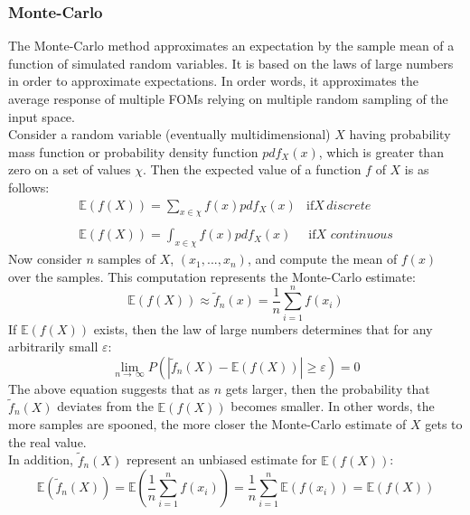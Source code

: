 \subsubsection{Monte-Carlo}
\label{subsub:MCtheory}
The Monte-Carlo method approximates an expectation by the sample mean of a function of 
simulated random variables. It is based on the laws of large numbers in order to approximate expectations. 
In order words, it approximates the average response of multiple FOMs 
relying on multiple random sampling of the input space. 
\\Consider a random variable (eventually multidimensional) $X$ having probability mass function or probability density function $pdf_{X}(x)$,
which is greater than zero on a set of values $\chi$. Then the expected value of a function $f$ of $X$ is as follows:
\begin{equation}
\begin{matrix}
\mathbb{E}(f(X)) =\sum_{x \in \chi} f(x)pdf_{X}(x) & \text{if} X \, discrete \\ 
\\ 
\mathbb{E}(f(X)) =\int_{x \in \chi} f(x)pdf_{X}(x) & \, \text{if} X \, \, continuous
\end{matrix}
\end{equation}
Now consider $n$ samples of $X$, $(x_{1},...,x_{n})$, and compute the mean of $f(x)$ over the samples. This computation represents the Monte-Carlo estimate:
\begin{equation}
  \mathbb{E}(f(X)) \approx   \widetilde{f}_{n}(x) = \frac{1}{n} \sum_{i=1}^{n} f(x_{i})  
\end{equation}
If $\mathbb{E}(f(X))$ exists, then the law of large numbers determines that for any arbitrarily small $\varepsilon$:
\begin{equation}
  \lim_{n\rightarrow \, \infty} P( \left | \widetilde{f}_{n}(X) - \mathbb{E}(f(X))  \right |\geq \varepsilon) = 0
\end{equation}
The above equation suggests that as $n$ gets larger, then the probability that $\widetilde{f}_{n}(X)$ deviates 
from the $\mathbb{E}(f(X))$ becomes smaller. In other words, the more samples are spooned, the more closer the Monte-Carlo estimate of $X$ gets to the real value.
\\In addition, $\widetilde{f}_{n}(X)$ represent an unbiased estimate for $\mathbb{E}(f(X))$:
\begin{equation}
\mathbb{E}(\widetilde{f}_{n}(X)) = \mathbb{E} \left ( \frac{1}{n} \sum_{i=1}^{n} f(x_{i})   \right ) = 
\frac{1}{n} \sum_{i=1}^{n} \mathbb{E}(f(x_{i})) =   \mathbb{E}(f(X)) 
\end{equation}
